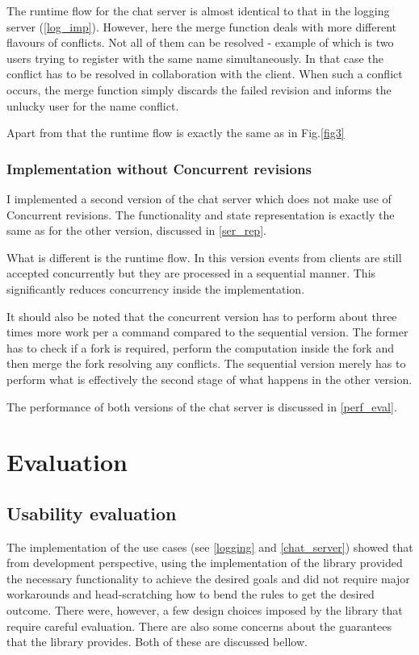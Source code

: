 \documentclass[12pt,twoside,notitlepage]{report}
\begin{document}
{The runtime flow for the chat server is almost identical to that in the logging server (\ref{log_imp}). However, here the merge function deals with more different flavours of conflicts. Not all of them can be resolved - example of which is two users trying to register with the same name simultaneously. In that case the conflict has to be resolved in collaboration with the client. When such a conflict occurs, the merge function simply discards the failed revision and informs the unlucky user for the name conflict. 

Apart from that the runtime flow is exactly the same as in Fig.\ref{fig3}

\subsection{Implementation without Concurrent revisions}
\label{imp_no}
I implemented a second version of the chat server which does not make use of Concurrent revisions. The functionality and state representation is exactly the same as for the other version, discussed in \ref{ser_rep}. 

What is different is the runtime flow. In this version events from clients are still accepted concurrently but they are processed in a sequential manner. This significantly reduces concurrency inside the implementation. 

It should also be noted that the concurrent version has to perform about three times more work per a command compared to the sequential version. The former has to check if a fork is required, perform the computation inside the fork and then merge the fork resolving any conflicts. The sequential version merely has to perform what is effectively the second stage of what happens in the other version.

The performance of both versions of the chat server is discussed in \ref{perf_eval}.


\cleardoublepage
\chapter{Evaluation}

\section{Usability evaluation}
The implementation of the use cases (see \ref{logging} and \ref{chat_server}) showed that from development perspective, using the implementation of the library provided the necessary functionality to achieve the desired goals and did not require major workarounds and head-scratching how to bend the rules to get the desired outcome. There were, however, a few design choices imposed by the library that require careful evaluation. There are also some concerns about the guarantees that the library provides. Both of these are discussed bellow.

}
\end{document}
